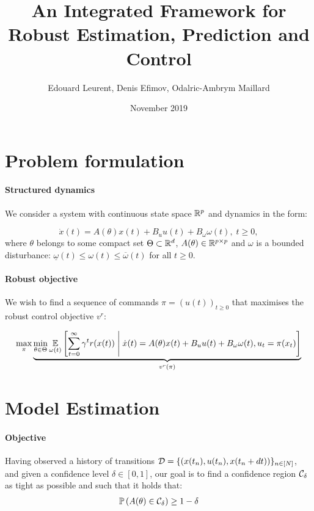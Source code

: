 \documentclass{article}
\title{An Integrated Framework for Robust Estimation, Prediction and Control}
\author{Edouard Leurent, Denis Efimov, Odalric-Ambrym Maillard}
\date{November 2019}
\begin{document}
\maketitle

\section{Problem formulation}

\paragraph{Structured dynamics}
We consider a system with continuous state space $\mathbb{R}^p$ and dynamics in the form:

\begin{equation}
\label{eq:dynamics}
\dot{x}(t)=A(\theta)x(t)+B_u u(t) + B_\omega \omega(t),\;t\geq0,
\end{equation}
where $\theta$ belongs to some compact set $\Theta \subset \mathbb{R}^d$, $A(\theta)\in\mathbb{R}^{p\times p}$ and $\omega$ is a bounded disturbance: $\underline{\omega}(t)\leq \omega(t)\leq\overline{\omega}(t)$ for all $t\geq0$.

\paragraph{Robust objective}

We wish to find a sequence of commands $\pi=(u(t))_{t\geq 0}$ that maximises the robust control objective $v^r$:

\begin{equation}
\label{eq:robust-control}
\max_\pi \underbrace{\min_{\theta \in \Theta} \operatorname*{\mathbb{E}}\limits_{\omega(t)}\left[\sum_{t=0}^\infty \gamma^t r(x(t))\;\middle|\; \dot{x}(t) = A(\theta) x(t) + B_u u(t) + B_\omega\omega(t), u_t = \pi(x_t)\right]}_{v^r(\pi)}
\end{equation}

\section{Model Estimation}

\paragraph{Objective}%
Having observed a history of transitions $\mathcal{D} = \{(x(t_n), u(t_n), x(t_n+dt))\}_{n\in[N]}$, and given a confidence level $\delta\in[0, 1]$, our goal is to find a confidence region $\mathcal{C}_\delta$ as tight as possible and such that it holds that:
\begin{align}
\mathbb{P}\left(A(\theta)\in \mathcal{C}_\delta\right) \geq 1-\delta
\label{eq:polytope}
\end{align}
\end{document}
